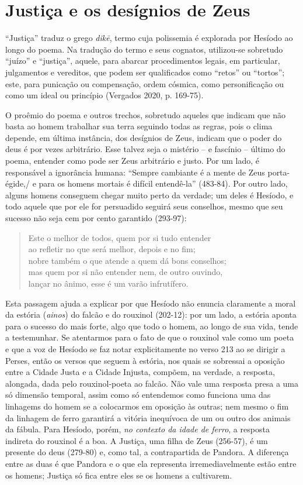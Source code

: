 \section{Justiça e os desígnios de Zeus}

``Justiça'' traduz o grego \emph{dikē}, termo cuja polissemia é
explorada por Hesíodo ao longo do poema. Na tradução do termo e seus
cognatos, utilizou-se sobretudo ``juízo'' e ``justiça'', aquele, para
abarcar procedimentos legais, em particular, julgamentos e vereditos,
que podem ser qualificados como ``retos'' ou ``tortos''; este, para
punicação ou compensação, ordem cósmica, como personificação ou como um
ideal ou princípio (Vergados 2020, p. 169-75).

O proêmio do poema e outros trechos, sobretudo aqueles que indicam que
não basta ao homem trabalhar sua terra seguindo todas as regras, pois o
clima depende, em última instância, dos desígnios de Zeus, indicam que o
poder do deus é por vezes arbitrário. Esse talvez seja o mistério -- e
fascínio -- último do poema, entender como pode ser Zeus arbitrário e
justo. Por um lado, é responsável a ignorância humana: ``Sempre
cambiante é a mente de Zeus porta-égide,/ e para os homens mortais é
difícil entendê-la'' (483-84). Por outro lado, alguns homens conseguem
chegar muito perto da verdade; um deles é Hesíodo, e todo aquele que por
ele for persuadido seguirá seus conselhos, mesmo que seu sucesso não
seja cem por cento garantido (293-97):

\begin{verse}
Este o melhor de todos, quem por si tudo entender\\
ao refletir no que será melhor, depois e no fim;\\
nobre também o que atende a quem dá bons conselhos;\\
mas quem por si não entender nem, de outro ouvindo,\\
lançar no ânimo, esse é um varão infrutífero.
\end{verse}

Esta passagem ajuda a explicar por que Hesíodo não enuncia claramente a
moral da estória (\emph{ainos}) do falcão e do rouxinol (202-12): por um
lado, a estória aponta para o sucesso do mais forte, algo que todo o
homem, ao longo de sua vida, tende a testemunhar. Se atentarmos para o
fato de que o rouxinol vale como um poeta e que a voz de Hesíodo se faz
notar explicitamente no verso 213 ao se dirigir a Perses, então os
versos que seguem à estória, nos quais se sobressai a oposição entre a
Cidade Justa e a Cidade Injusta, compõem, na verdade, a resposta,
alongada, dada pelo rouxinol-poeta ao falcão. Não vale uma resposta
presa a uma só dimensão temporal, assim como só entendemos como funciona
uma das linhagems do homem se a colocarmos em oposição às outras; nem
mesmo o fim da linhagem de ferro garantirá a vitória inequívoca de um ou
outro dos animais da fábula. Para Hesíodo, porém, \emph{no contexto da
idade de ferro}, a resposta indireta do rouxinol é a boa. A Justiça, uma
filha de Zeus (256-57), é um presente do deus (279-80) e, como tal, a
contrapartida de Pandora. A diferença entre as duas é que Pandora e o
que ela representa irremediavelmente estão entre os homens; Justiça só
fica entre eles se os homens a cultivarem.

